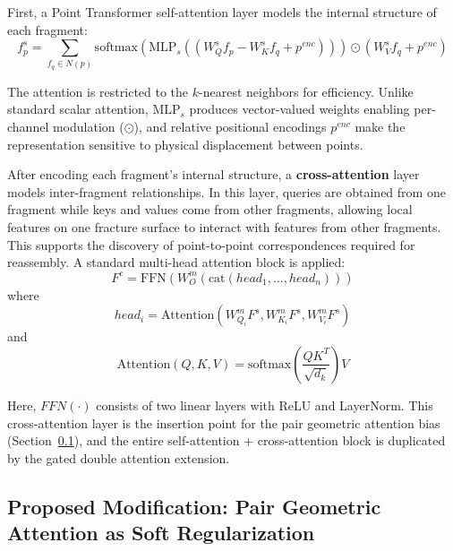 First, a Point Transformer self-attention layer models the internal structure of each fragment:
\begin{equation}
\label{eq:self_attn}
f_p^s = \sum_{f_q \in N(p)} \text{softmax}(\text{MLP}_s((W_Q^s f_p - W_K^s f_q + p^{enc}))) \odot (W_V^s f_q + p^{enc})
\end{equation}

The attention is restricted to the \(k\)-nearest neighbors for efficiency. Unlike standard scalar attention, \(\text{MLP}_s\) produces vector-valued weights enabling per-channel modulation (\(\odot\)), and relative positional encodings \(p^{enc}\) make the representation sensitive to physical displacement between points.

After encoding each fragment's internal structure, a \textbf{cross-attention} layer models inter-fragment relationships. In this layer, queries are obtained from one fragment while keys and values come from other fragments, allowing local features on one fracture surface to interact with features from other fragments. This supports the discovery of point-to-point correspondences required for reassembly. A standard multi-head attention block is applied:
\begin{equation}
\label{eq:cross_attn}
F^c = \text{FFN}(W_O^m(\text{cat}(head_1, \dots, head_n)))
\end{equation}
where
\begin{equation}
\label{eq:cross_head}
head_i = \text{Attention}(W_{Q_i}^m F^s, W_{K_i}^m F^s, W_{V_i}^m F^s)
\end{equation}
and
\begin{equation}
\label{eq:attention}
\text{Attention}(Q, K, V) = \text{softmax}\!\left(\frac{QK^T}{\sqrt{d_k}}\right)V
\end{equation}

Here, \(FFN(\cdot)\) consists of two linear layers with ReLU and LayerNorm. This cross-attention layer is the insertion point for the pair geometric attention bias (Section~\ref{par:pair_attn_limitations}), and the entire self-attention + cross-attention block is duplicated by the gated double attention extension.

\subsection{Proposed Modification: Pair Geometric Attention as Soft Regularization}
\label{par:pair_attn_limitations}

